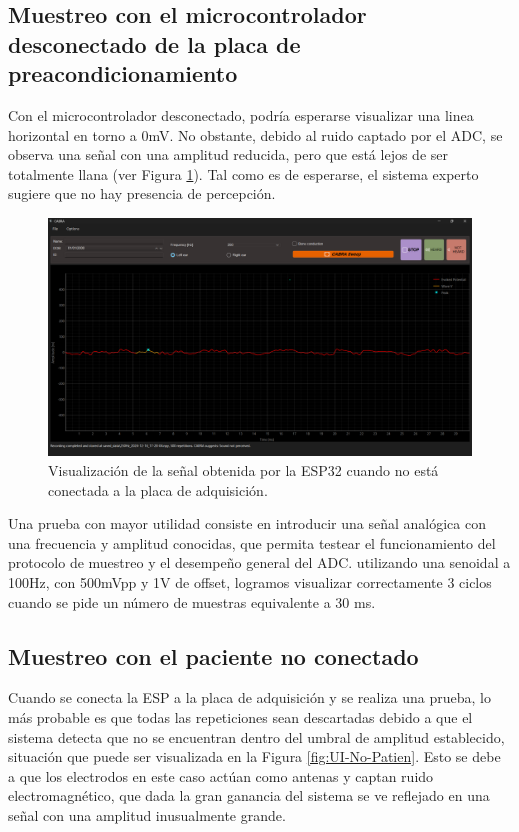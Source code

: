 \subsection{Muestreo con el microcontrolador desconectado de la placa de preacondicionamiento}

Con el microcontrolador desconectado, podría esperarse visualizar una linea horizontal en torno a 0mV. No obstante, debido al ruido captado por el ADC, se observa una señal con una amplitud reducida, pero que está lejos de ser totalmente llana (ver Figura \ref{fig:UI-No-Board}). Tal como es de esperarse, el sistema experto sugiere que no hay presencia de percepción.

\begin{figure}[H]
    \centering
    \includegraphics[width=1\linewidth]{figuras/UI-No-Board.png}
    \caption{Visualización de la señal obtenida por la ESP32 cuando no está conectada a la placa de adquisición.}
    \label{fig:UI-No-Board}
\end{figure}

Una prueba con mayor utilidad consiste en introducir una señal analógica con una frecuencia y amplitud conocidas, que permita testear el funcionamiento del protocolo de muestreo y el desempeño general del ADC. utilizando una senoidal a 100Hz, con 500mVpp y 1V de offset, logramos visualizar correctamente 3 ciclos cuando se pide un número de muestras equivalente a 30 ms.

\subsection{Muestreo con el paciente no conectado}

Cuando se conecta la ESP a la placa de adquisición y se realiza una prueba, lo más probable es que todas las repeticiones sean descartadas debido a que el sistema detecta que no se encuentran dentro del umbral de amplitud establecido, situación que puede ser visualizada en la Figura \ref{fig:UI-No-Patien}. Esto se debe a que los electrodos en este caso actúan como antenas y captan ruido electromagnético, que dada la gran ganancia del sistema se ve reflejado en una señal con una amplitud inusualmente grande. 

